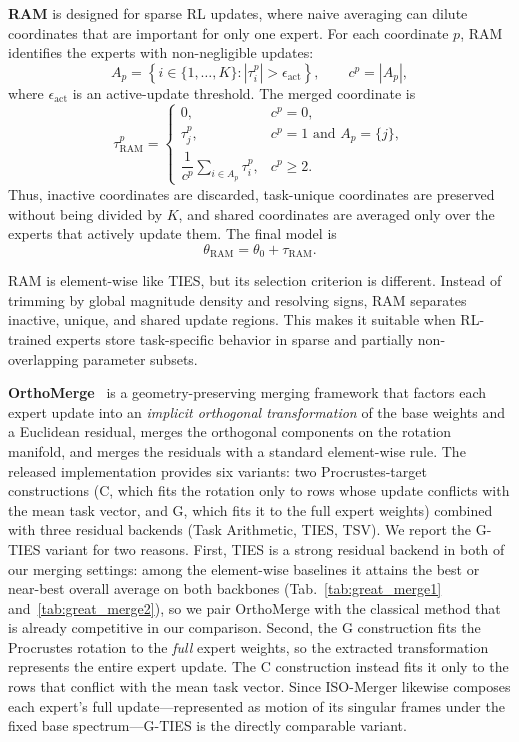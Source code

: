 \documentclass[11pt, a4paper]{utda}
\theoremstyle{plain}
\theoremstyle{definition}
\theoremstyle{remark}
\providecommand{\RAM}{\mathrm{RAM}}
\begin{document}
\textbf{RAM} is designed for sparse RL updates, where naive averaging can dilute
coordinates that are important for only one expert. For each coordinate $p$, RAM
identifies the experts with non-negligible updates:
\begin{equation}
    A_p = \left\{ i \in \{1,\ldots,K\}: |\tau_i^p| > \epsilon_{\mathrm{act}} \right\},
    \qquad
    c^p = |A_p|,
\end{equation}
where $\epsilon_{\mathrm{act}}$ is an active-update threshold. The merged
coordinate is
\begin{equation}
\tau_{\RAM}^p =
\begin{cases}
0, & c^p = 0, \\
\tau_j^p, & c^p = 1 \text{ and } A_p = \{j\}, \\
\dfrac{1}{c^p}\displaystyle\sum_{i\in A_p}\tau_i^p, & c^p \ge 2.
\end{cases}
\label{eq:ram-coordinate}
\end{equation}
Thus, inactive coordinates are discarded, task-unique coordinates are preserved
without being divided by $K$, and shared coordinates are averaged only over the
experts that actively update them. The final model is
\begin{equation}
    \theta_{\RAM} = \theta_0+\tau_{\RAM}.
\end{equation}

RAM is element-wise like TIES, but its selection criterion is different. Instead
of trimming by global magnitude density and resolving signs, RAM separates
inactive, unique, and shared update regions. This makes it suitable when
RL-trained experts store task-specific behavior in sparse and partially
non-overlapping parameter subsets.

\textbf{OrthoMerge}~\cite{yang2026orthogonal} is a geometry-preserving merging
framework that factors each expert update into an \emph{implicit orthogonal
transformation} of the base weights and a Euclidean residual, merges the
orthogonal components on the rotation manifold, and merges the residuals with a
standard element-wise rule. The released implementation provides six variants:
two Procrustes-target constructions (\textsc{C}, which fits the rotation only to
rows whose update conflicts with the mean task vector, and \textsc{G}, which
fits it to the full expert weights) combined with three residual backends
(Task Arithmetic, TIES, TSV). We report the \textsc{G}-TIES variant for two reasons. First, TIES is a strong
residual backend in both of our merging settings: among the element-wise
baselines it attains the best or near-best overall average on both backbones
(Tab.~\ref{tab:great_merge1} and~\ref{tab:great_merge2}), so we pair OrthoMerge with
the classical method that is already competitive in our comparison. Second,
the \textsc{G} construction fits the Procrustes rotation to the \emph{full}
expert weights, so the extracted transformation represents the entire expert
update. The \textsc{C} construction instead fits it only to the rows that
conflict with the mean task vector. Since ISO-Merger likewise composes each
expert's full update---represented as motion of its singular frames under the
fixed base spectrum---\textsc{G}-TIES is the directly comparable variant.
\end{document}
